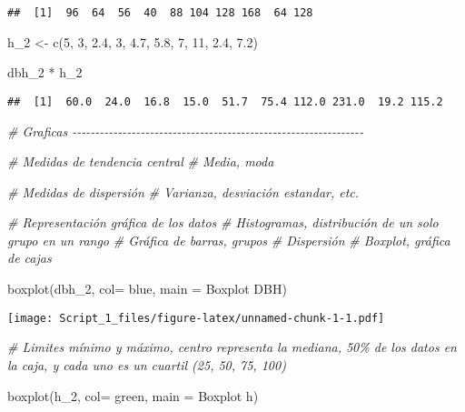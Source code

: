 \documentclass[
]{article}
\newenvironment{Shaded}{\begin{snugshade}}{\end{snugshade}}
\newcommand{\AttributeTok}[1]{\textcolor[rgb]{0.77,0.63,0.00}{#1}}
\newcommand{\CommentTok}[1]{\textcolor[rgb]{0.56,0.35,0.01}{\textit{#1}}}
\newcommand{\DecValTok}[1]{\textcolor[rgb]{0.00,0.00,0.81}{#1}}
\newcommand{\FloatTok}[1]{\textcolor[rgb]{0.00,0.00,0.81}{#1}}
\newcommand{\FunctionTok}[1]{\textcolor[rgb]{0.00,0.00,0.00}{#1}}
\newcommand{\NormalTok}[1]{#1}
\newcommand{\OtherTok}[1]{\textcolor[rgb]{0.56,0.35,0.01}{#1}}
\newcommand{\SpecialCharTok}[1]{\textcolor[rgb]{0.00,0.00,0.00}{#1}}
\newcommand{\StringTok}[1]{\textcolor[rgb]{0.31,0.60,0.02}{#1}}
\begin{document}
\begin{verbatim}
##  [1]  96  64  56  40  88 104 128 168  64 128
\end{verbatim}

\begin{Shaded}
\begin{Highlighting}[]
\NormalTok{h\_2 }\OtherTok{\textless{}{-}} \FunctionTok{c}\NormalTok{(}\DecValTok{5}\NormalTok{, }\DecValTok{3}\NormalTok{, }\FloatTok{2.4}\NormalTok{, }\DecValTok{3}\NormalTok{, }\FloatTok{4.7}\NormalTok{, }\FloatTok{5.8}\NormalTok{, }\DecValTok{7}\NormalTok{, }\DecValTok{11}\NormalTok{, }\FloatTok{2.4}\NormalTok{, }\FloatTok{7.2}\NormalTok{)}

\NormalTok{dbh\_2 }\SpecialCharTok{*}\NormalTok{ h\_2}
\end{Highlighting}
\end{Shaded}

\begin{verbatim}
##  [1]  60.0  24.0  16.8  15.0  51.7  75.4 112.0 231.0  19.2 115.2
\end{verbatim}

\begin{Shaded}
\begin{Highlighting}[]
\CommentTok{\# Graficas {-}{-}{-}{-}{-}{-}{-}{-}{-}{-}{-}{-}{-}{-}{-}{-}{-}{-}{-}{-}{-}{-}{-}{-}{-}{-}{-}{-}{-}{-}{-}{-}{-}{-}{-}{-}{-}{-}{-}{-}{-}{-}{-}{-}{-}{-}{-}{-}{-}{-}{-}{-}{-}{-}{-}{-}{-}{-}{-}{-}{-}{-}{-}{-}}

\CommentTok{\# Medidas de tendencia central}
\CommentTok{\# Media, moda}

\CommentTok{\# Medidas de dispersión}
\CommentTok{\# Varianza, desviación estandar, etc.}

\CommentTok{\# Representación gráfica de los datos}
\CommentTok{\# Histogramas, distribución de un solo grupo en un rango}
\CommentTok{\# Gráfica de barras, grupos }
\CommentTok{\# Dispersión}
\CommentTok{\# Boxplot, gráfica de cajas}

\FunctionTok{boxplot}\NormalTok{(dbh\_2, }\AttributeTok{col=} \StringTok{\textquotesingle{}blue\textquotesingle{}}\NormalTok{, }\AttributeTok{main =} \StringTok{\textquotesingle{}Boxplot DBH\textquotesingle{}}\NormalTok{)}
\end{Highlighting}
\end{Shaded}

\texttt{[image: Script\_1\_files/figure-latex/unnamed-chunk-1-1.pdf]}

\begin{Shaded}
\begin{Highlighting}[]
\CommentTok{\# Limites mínimo y máximo, centro representa la mediana, 50\% de los datos en la caja, y cada uno es un cuartil (25, 50, 75, 100)}

\FunctionTok{boxplot}\NormalTok{(h\_2, }\AttributeTok{col=} \StringTok{\textquotesingle{}green\textquotesingle{}}\NormalTok{, }\AttributeTok{main =} \StringTok{\textquotesingle{}Boxplot h\textquotesingle{}}\NormalTok{)}
\end{Highlighting}
\end{Shaded}
\end{document}
